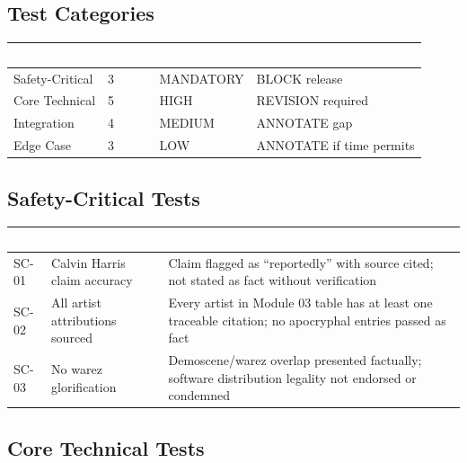 \documentclass[11pt,letterpaper]{article}
\newcommand{\tableheader}[1]{\textbf{\sffamily\textcolor{white}{#1}}}
\begin{document}
\subsection{Test Categories}

\begin{center}
\begin{tabularx}{\textwidth}{L{3.5cm}C{1.5cm}C{2cm}L{4cm}}
\toprule
{}
\tableheader{Category} & \tableheader{Count} & \tableheader{Priority} & \tableheader{Failure Action} \\
\midrule
Safety-Critical & 3 & MANDATORY & BLOCK release \\
Core Technical & 5 & HIGH & REVISION required \\
Integration & 4 & MEDIUM & ANNOTATE gap \\
Edge Case & 3 & LOW & ANNOTATE if time permits \\
\bottomrule
\end{tabularx}
\end{center}

\subsection{Safety-Critical Tests}

\begin{center}
\begin{tabularx}{\textwidth}{C{1.2cm}L{4cm}X}
\toprule
{}
\tableheader{ID} & \tableheader{Verifies} & \tableheader{Expected Result} \\
\midrule
SC-01 & Calvin Harris claim accuracy & Claim flagged as ``reportedly'' with source cited; not stated as fact without verification \\
SC-02 & All artist attributions sourced & Every artist in Module 03 table has at least one traceable citation; no apocryphal entries passed as fact \\
SC-03 & No warez glorification & Demoscene/warez overlap presented factually; software distribution legality not endorsed or condemned \\
\bottomrule
\end{tabularx}
\end{center}

\subsection{Core Technical Tests}
\end{document}
